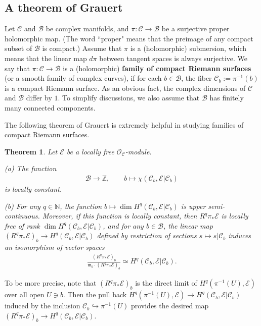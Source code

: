 \documentclass[12pt,a4paper,notitlepage]{report}
\theoremstyle{definition}
\theoremstyle{plain}
\newtheorem{thm}[df]{Theorem}
\newcommand{\fk}{\mathfrak}
\newcommand{\mc}{\mathcal}
\newcommand{\scr}{\mathscr}
\numberwithin{equation}{section}
\begin{document}
\subsection*{A theorem of Grauert}

Let $\mc C$ and $\mc B$ be complex manifolds, and $\pi:\mc C\rightarrow \mc B$ be a surjective proper holomorphic map. (The word ``proper" means that the preimage of any compact subset of $\mc B$ is compact.)  Assume that $\pi$ is a (holomorphic) submersion, which means that the linear map $d\pi$ between tangent spaces is always surjective. We say that $\pi:\mc C\rightarrow \mc B$ is a (holomorphic) \textbf{family of compact Riemann surfaces} (or a smooth family of complex curves), if for each $b\in\mc B$, the fiber $\mc C_b:=\pi^{-1}(b)$ \index{Cb@$\mc C_b=\pi^{-1}(b)$} is a compact Riemann surface. As an obvious fact, the complex dimensions of $\mc C$ and $\mc B$ differ by $1$. To simplify discussions, we also assume that $\mc B$ has finitely many connected components.



The following theorem of Grauert \cite{Gra60} is extremely helpful in studying families of compact Riemann surfaces.
\begin{thm}\label{lb2}
Let $\scr E$ be a locally free $\scr O_{\mc C}$-module.

(a) The function
\begin{gather*}
\mc B\rightarrow \mathbb Z, \qquad b\mapsto\chi(\mc C_b,\scr E|\mc C_b)
\end{gather*}
is locally constant. 

(b) For any $q\in\mathbb N$, the function  $b\mapsto\dim H^q(\mc C_b,\scr E|\mc C_b)$ is upper semi-continuous. Moreover, if this function is locally constant, then $R^q\pi_*\scr E$ is locally free of rank $\dim H^q(\mc C_b,\scr E|\mc C_b)$, and for any $b\in\mc B$, the linear map $(R^q\pi_*\scr E)_b\rightarrow H^q(\mc C_b,\scr E|\mc C_b)$ defined by  restriction of sections $s\mapsto s|{\mc C_b}$ induces an isomorphism of vector spaces
\begin{align}
\frac{(R^q\pi_*\scr E)_b}{\fk m_b\cdot (R^q\pi_*\scr E)_b}\simeq H^q(\mc C_b,\scr E|\mc C_b).
\end{align}
\end{thm}
To be more precise, note that $(R^q\pi_*\scr E)_b$ is the direct limit of $H^q(\pi^{-1}(U),\scr E)$ over all open $U\ni b$. Then the  pull back $H^q(\pi^{-1}(U),\scr E)\rightarrow H^q(\mc C_b,\scr E|\mc C_b)$   induced by the inclusion $\mc C_b\hookrightarrow \pi^{-1}(U)$ provides the desired map $(R^q\pi_*\scr E)_b\rightarrow H^q(\mc C_b,\scr E|\mc C_b)$.
\end{document}
